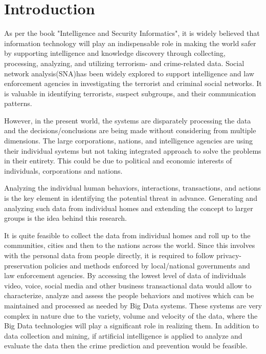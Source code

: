 \documentclass[sigconf]{acmart}
\begin{document}

\maketitle

\section{Introduction}
As per the book "Intelligence and Security Informatics"\cite{Kantor2005}, it is widely believed that information technology will play an indispensable role in making the world safer by supporting intelligence and knowledge discovery through collecting, processing, analyzing, and utilizing terrorism- and crime-related data. Social network analysis(SNA)has been widely explored to support intelligence and law enforcement agencies in investigating the terrorist and criminal social networks. It is valuable in identifying terrorists, suspect subgroups, and their communication patterns.

However, in the present world, the systems are disparately processing the data and the decisions/conclusions are being made without considering from multiple dimensions. The large corporations, nations, and intelligence agencies are using their individual systems but not taking integrated approach to solve the problems in their entirety. This could be due to political and economic interests of individuals, corporations and nations.

Analyzing the individual human behaviors, interactions, transactions, and actions is the key element in identifying the potential threat in advance. Generating and analyzing such data from individual homes and extending the concept to larger groups is the idea behind this research.

It is quite feasible to collect the data from individual homes and roll up to the communities, cities and then to the nations across the world. Since this involves with the personal data from people directly, it is required to follow privacy-preservation policies and methods enforced by local/national governments and law enforcement agencies. By accessing the lowest level of data of individuals video, voice, social media and other business transactional data would allow to characterize, analyze and assess the people behaviors and motives which can be maintained and processed as needed by Big Data systems. These systems are very complex in nature due to the variety, volume and velocity of the data, where the Big Data technologies will play a significant role in realizing them. In addition to data collection and mining, if artificial intelligence is applied to analyze and evaluate the data then the crime prediction and prevention would be feasible.
\end{document}
